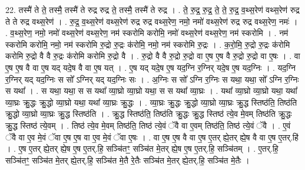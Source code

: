 \documentclass[17pt]{extarticle}
\begin{document}
22. तस्मै॑ ते ते॒ तस्मै॒ तस्मै॑ ते रुद्र रुद्र ते॒ तस्मै॒ तस्मै॑ ते रुद्र । . ते॒ रु॒द्र॒ रु॒द्र॒ ते॒ ते॒ रु॒द्र॒ व॒थ्स॒रेण॑ वथ्स॒रेण॑ रुद्र ते ते रुद्र वथ्स॒रेण॑ । . रु॒द्र॒ व॒थ्स॒रेण॑ वथ्स॒रेण॑ रुद्र रुद्र वथ्स॒रेण॒ नमो॒ नमो॑ वथ्स॒रेण॑ रुद्र रुद्र वथ्स॒रेण॒ नमः॑ । . व॒थ्स॒रेण॒ नमो॒ नमो॑ वथ्स॒रेण॑ वथ्स॒रेण॒ नम॑ स्करोमि करोमि॒ नमो॑ वथ्स॒रेण॑ वथ्स॒रेण॒ नम॑ स्करोमि । . नम॑ स्करोमि करोमि॒ नमो॒ नम॑ स्करोमि रु॒द्रो रु॒द्रः क॑रोमि॒ नमो॒ नम॑ स्करोमि रु॒द्रः । . क॒रो॒मि॒ रु॒द्रो रु॒द्रः क॑रोमि करोमि रु॒द्रो वै वै रु॒द्रः क॑रोमि करोमि रु॒द्रो वै । . रु॒द्रो वै वै रु॒द्रो रु॒द्रो वा ए॒ष ए॒ष वै रु॒द्रो रु॒द्रो वा ए॒षः । . वा ए॒ष ए॒ष वै वा ए॒ष यद् यदे॒ष वै वा ए॒ष यत् । . ए॒ष यद् यदे॒ष ए॒ष यद॒ग्नि र॒ग्निर् यदे॒ष ए॒ष यद॒ग्निः । . यद॒ग्नि र॒ग्निर् यद् यद॒ग्निः स सो᳚ ऽग्निर् यद् यद॒ग्निः सः । . अ॒ग्निः स सो᳚ ऽग्नि र॒ग्निः स यथा॒ यथा॒ सो᳚ ऽग्नि र॒ग्निः स यथा᳚ । . स यथा॒ यथा॒ स स यथा᳚ व्या॒घ्रो व्या॒घ्रो यथा॒ स स यथा᳚ व्या॒घ्रः । . यथा᳚ व्या॒घ्रो व्या॒घ्रो यथा॒ यथा᳚ व्या॒घ्रः क्रु॒द्धः क्रु॒द्धो व्या॒घ्रो यथा॒ यथा᳚ व्या॒घ्रः क्रु॒द्धः । . व्या॒घ्रः क्रु॒द्धः क्रु॒द्धो व्या॒घ्रो व्या॒घ्रः क्रु॒द्ध स्तिष्ठ॑ति॒ तिष्ठ॑ति क्रु॒द्धो व्या॒घ्रो व्या॒घ्रः क्रु॒द्ध स्तिष्ठ॑ति । . क्रु॒द्ध स्तिष्ठ॑ति॒ तिष्ठ॑ति क्रु॒द्धः क्रु॒द्ध स्तिष्ठ॑ त्ये॒व मे॒वम् तिष्ठ॑ति क्रु॒द्धः क्रु॒द्ध स्तिष्ठ॑ त्ये॒वम् । . तिष्ठ॑ त्ये॒व मे॒वम् तिष्ठ॑ति॒ तिष्ठ॑ त्ये॒वं ॅवै वा ए॒वम् तिष्ठ॑ति॒ तिष्ठ॑ त्ये॒वं ॅवै । . ए॒वं ॅवै वा ए॒व मे॒वं ॅवा ए॒ष ए॒ष वा ए॒व मे॒वं ॅवा ए॒षः । . वा ए॒ष ए॒ष वै वा ए॒ष ए॒तर् ह्ये॒तर् ह्ये॒ष वै वा ए॒ष ए॒तर्.हि॑ । . ए॒ष ए॒तर् ह्ये॒तर् ह्ये॒ष ए॒ष ए॒तर्.हि॒ सञ्चि॑तꣳ॒॒ सञ्चि॑त मे॒तर् ह्ये॒ष ए॒ष ए॒तर्.हि॒ सञ्चि॑तम् । . ए॒तर्.हि॒ सञ्चि॑तꣳ॒॒ सञ्चि॑त मे॒तर् ह्ये॒तर्.हि॒ सञ्चि॑त मे॒तै रे॒तैः सञ्चि॑त मे॒तर् ह्ये॒तर्.हि॒ सञ्चि॑त मे॒तैः । \newline
\end{document}

